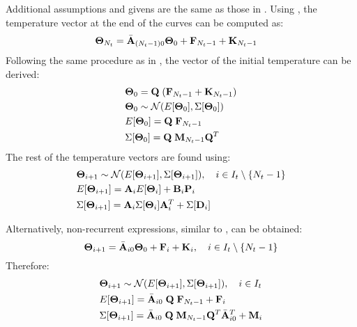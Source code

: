 Additional assumptions and givens are the same as those in . Using , the temperature vector at the end of the curves can be computed as:
\begin{align*}
  \mathbf{\Theta}_{N_t} & = \Bar{\mathbf{A}}_{(N_t - 1)0} \mathbf{\Theta}_0 + \mathbf{F}_{N_t - 1} + \mathbf{K}_{N_t - 1}
\end{align*}
Following the same procedure as in , the vector of the initial temperature can be derived:
\begin{align*}
  & \mathbf{\Theta}_0 = \mathbf{Q} \; (\mathbf{F}_{N_t - 1} + \mathbf{K}_{N_t - 1}) \\
  & \mathbf{\Theta}_0 \sim \mathcal{N}(E[\mathbf{\Theta}_0], \Sigma[\mathbf{\Theta}_0]) \\
  & E[\mathbf{\Theta}_0] = \mathbf{Q} \; \mathbf{F}_{N_t - 1} \\
  & \Sigma[\mathbf{\Theta}_0] = \mathbf{Q} \; \mathbf{M}_{N_t - 1} \mathbf{Q}^T
\end{align*}
The rest of the temperature vectors are found using:
\begin{align*}
  & \mathbf{\Theta}_{i + 1} \sim \mathcal{N}(E[\mathbf{\Theta}_{i + 1}], \Sigma[\mathbf{\Theta}_{i + 1}]), \hspace{10pt} i \in I_t \setminus \{N_t - 1\} \\
  & E[\mathbf{\Theta}_{i+1}] = \mathbf{A}_i E[\mathbf{\Theta}_i] + \mathbf{B}_i \mathbf{P}_i \\
  & \Sigma[\mathbf{\Theta}_{i+1}] = \mathbf{A}_i \Sigma[\mathbf{\Theta}_i] \mathbf{A}^T_i + \Sigma[\mathbf{D}_i]
\end{align*}

Alternatively, non-recurrent expressions, similar to , can be obtained:
\begin{equation*}
  \mathbf{\Theta}_{i + 1} = \Bar{\mathbf{A}}_{i0} \mathbf{\Theta}_0 + \mathbf{F}_i + \mathbf{K}_i, \hspace{10pt} i \in I_t \setminus \{N_t - 1\}
\end{equation*}
Therefore:
\begin{align*}
  & \mathbf{\Theta}_{i + 1} \sim \mathcal{N}(E[\mathbf{\Theta}_{i + 1}], \Sigma[\mathbf{\Theta}_{i + 1}]), \hspace{10pt} i \in I_t \\
  & E[\mathbf{\Theta}_{i + 1}] = \Bar{\mathbf{A}}_{i0} \; \mathbf{Q} \; \mathbf{F}_{N_t - 1} + \mathbf{F}_i \\
  & \Sigma[\mathbf{\Theta}_{i + 1}] = \Bar{\mathbf{A}}_{i0} \; \mathbf{Q} \; \mathbf{M}_{N_t - 1} \mathbf{Q}^T \Bar{\mathbf{A}}_{i0}^T + \mathbf{M}_i
\end{align*}
